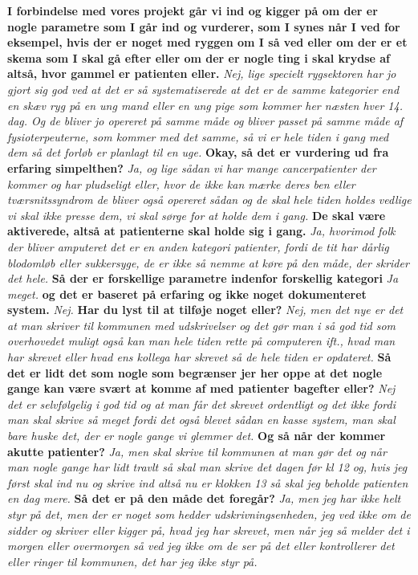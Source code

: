 \textbf{I forbindelse med vores projekt går vi ind og kigger på om der er nogle parametre som I går ind og vurderer, som I synes når I ved for eksempel, hvis der er noget med ryggen om I så ved eller om der er et skema som I skal gå efter eller om der er nogle ting i skal krydse af altså, hvor gammel er patienten eller.}
\textit{Nej, lige specielt rygsektoren har jo gjort sig god ved at det er så systematiserede at det er de samme kategorier end en skæv ryg på en ung mand eller en ung pige som kommer her næsten hver 14. dag. Og de bliver jo opereret på samme måde og bliver passet på samme måde af fysioterpeuterne, som kommer med det samme, så vi er hele tiden i gang med dem så det forløb er planlagt til en uge. }
\textbf{Okay, så det er vurdering ud fra erfaring simpelthen?}
\textit{Ja, og lige sådan vi har mange cancerpatienter der kommer og har pludseligt eller, hvor de ikke kan mærke deres ben eller tværsnitssyndrom de bliver også opereret sådan og de skal hele tiden holdes vedlige vi skal ikke presse dem, vi skal sørge for at holde dem i gang.}
\textbf{De skal være aktiverede, altså at patienterne skal holde sig i gang.}
\textit{Ja, hvorimod folk der bliver amputeret det er en anden kategori patienter, fordi de tit har dårlig blodomløb eller sukkersyge, de er ikke så nemme at køre på den måde, der skrider det hele.}
\textbf{Så der er forskellige parametre indenfor forskellig kategori }
\textit{Ja meget.}
\textbf{og det er baseret på erfaring og ikke noget dokumenteret system.}
\textit{ Nej.}
\textbf{Har du lyst til at tilføje noget eller?}
\textit{Nej, men det nye er det at man skriver til kommunen med udskrivelser og det gør man i så god tid som overhovedet muligt også kan man hele tiden rette på computeren ift., hvad man har skrevet eller hvad ens kollega har skrevet så de hele tiden er opdateret. }
\textbf{Så det er lidt det som nogle som begrænser jer her oppe at det nogle gange kan være svært at komme af med patienter bagefter eller?}
\textit{Nej det er selvfølgelig i god tid og at man får det skrevet ordentligt og det ikke fordi man skal skrive så meget fordi det også blevet sådan en kasse system, man skal bare huske det, der er nogle gange vi glemmer det.}
\textbf{Og så når der kommer akutte patienter?}
\textit{Ja, men skal skrive til kommunen at man gør det og når man nogle gange har lidt travlt så skal man skrive det dagen før kl 12 og, hvis jeg først skal ind nu og skrive ind altså nu er klokken 13 så skal jeg beholde patienten en dag mere.}
\textbf{Så det er på den måde det foregår?}
\textit{Ja, men jeg har ikke helt styr på det, men der er noget som hedder udskrivningsenheden, jeg ved ikke om de sidder og skriver eller kigger på, hvad jeg har skrevet, men når jeg så melder det i morgen eller overmorgen så ved jeg ikke om de ser på det eller kontrollerer det eller ringer til kommunen, det har jeg ikke styr på.}

